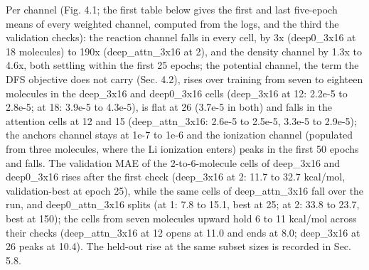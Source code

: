 \documentclass[10pt,a4paper]{article}
\begin{document}
Per channel (Fig. 4.1; the first table below gives the first and last five-epoch means of every weighted channel, computed from the logs, and the third the validation checks): the reaction channel falls in every cell, by 3x (deep0\_3x16 at 18 molecules) to 190x (deep\_attn\_3x16 at 2), and the density channel by 1.3x to 4.6x, both settling within the first 25 epochs; the potential channel, the term the DFS objective does not carry (Sec. 4.2), rises over training from seven to eighteen molecules in the deep\_3x16 and deep0\_3x16 cells (deep\_3x16 at 12: 2.2e-5 to 2.8e-5; at 18: 3.9e-5 to 4.3e-5), is flat at 26 (3.7e-5 in both) and falls in the attention cells at 12 and 15 (deep\_attn\_3x16: 2.6e-5 to 2.5e-5, 3.3e-5 to 2.9e-5); the anchors channel stays at 1e-7 to 1e-6 and the ionization channel (populated from three molecules, where the Li ionization enters) peaks in the first 50 epochs and falls. The validation MAE of the 2-to-6-molecule cells of deep\_3x16 and deep0\_3x16 rises after the first check (deep\_3x16 at 2: 11.7 to 32.7 kcal/mol, validation-best at epoch 25), while the same cells of deep\_attn\_3x16 fall over the run, and deep0\_attn\_3x16 splits (at 1: 7.8 to 15.1, best at 25; at 2: 33.8 to 23.7, best at 150); the cells from seven molecules upward hold 6 to 11 kcal/mol across their checks (deep\_attn\_3x16 at 12 opens at 11.0 and ends at 8.0; deep\_3x16 at 26 peaks at 10.4). The held-out rise at the same subset sizes is recorded in Sec. 5.8.
\end{document}
